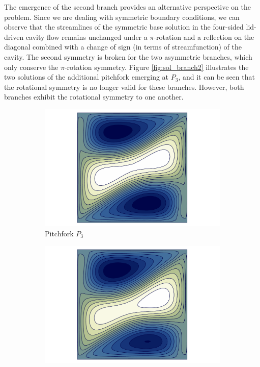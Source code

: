 The emergence of the second branch provides an alternative perspective on the
problem. Since we are dealing with symmetric boundary conditions, we can
observe that the streamlines of the symmetric base solution in the four-sided
lid-driven cavity flow remains unchanged under a $\pi$-rotation and a
reflection on the diagonal combined with a change of sign (in terms of
streamfunction) of the cavity. The second symmetry is broken for the two
asymmetric branches, which only conserve the $\pi$-rotation symmetry. Figure
\ref{fig:sol_branch2} illustrates the two solutions of the additional pitchfork
emerging at $P_3$, and it can be seen that the rotational symmetry is no
longer valid for these branches. However, both branches exhibit the rotational
symmetry to one another.

\begin{figure}[h!]
\centering
\begin{subfigure}[b]{0.25\textwidth}
  \centering
  \includegraphics[trim={3.6cm 0 3.6cm 0},clip,width=\textwidth]{figs/psi_Re353.356_pf3.pdf}
  \caption{Pitchfork $P_3$}
\end{subfigure}
\begin{subfigure}[b]{0.25\textwidth}
  \centering
  \includegraphics[trim={3.6cm 0 3.6cm 0},clip,width=\textwidth]{figs/psi_Re375.000_branch2_u_t_smaller.pdf}

\end{subfigure}
\end{figure}
